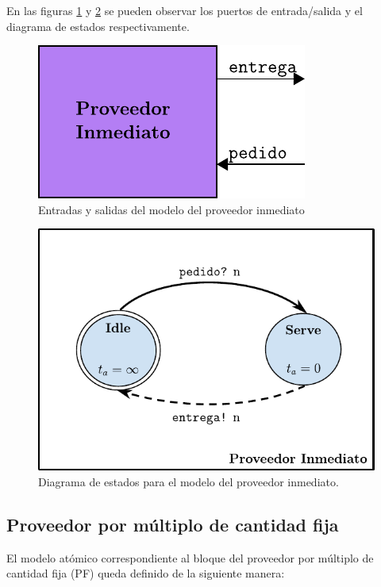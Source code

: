 \documentclass[10pt]{article}
\begin{document}
En las figuras \ref{fig:PI-esquematico} y \ref{fig:PI-estados} se pueden observar los puertos de entrada/salida y el diagrama de estados respectivamente.

\begin{figure}[htbp]
	\centering
	\includegraphics{img/PI-esquematico}
	\caption{Entradas y salidas del modelo del proveedor inmediato}
	\label{fig:PI-esquematico}
\end{figure}

\begin{figure}[htbp]
	\centering
	\includegraphics{img/proveedorInmediatodevsgraph}
	\caption{Diagrama de estados para el modelo del proveedor inmediato.}
	\label{fig:PI-estados}
\end{figure}


\subsection{Proveedor por múltiplo de cantidad fija\label{sec:PF}}
El modelo atómico correspondiente al bloque del proveedor por múltiplo de cantidad fija (PF) queda definido de la siguiente manera:
\end{document}
